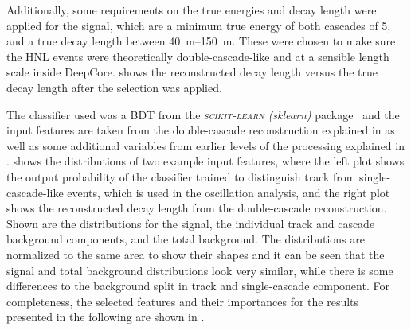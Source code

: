 Additionally, some requirements on the true energies and decay length were applied for the signal, which are a minimum true energy of both cascades of \SI{5}{\gev}, and a true decay length between \SIrange[range-phrase={~and~}]{40}{150}{\meter}. These were chosen to make sure the HNL events were theoretically double-cascade-like and at a sensible length scale inside DeepCore.  shows the reconstructed decay length versus the true decay length after the selection was applied.

The classifier used was a BDT from the \textit{\textsc{scikit-learn} (sklearn)} package~ and the input features are taken from the double-cascade reconstruction explained in  as well as some additional variables from earlier levels of the processing explained in .  shows the distributions of two example input features, where the left plot shows the output probability of the classifier trained to distinguish track from single-cascade-like events, which is used in the oscillation analysis, and the right plot shows the reconstructed decay length from the double-cascade reconstruction. Shown are the distributions for the signal, the individual track and cascade background components, and the total background. The distributions are normalized to the same area to show their shapes and it can be seen that the signal and total background distributions look very similar, while there is some differences to the background split in track and single-cascade component. For completeness, the selected features and their importances for the results presented in the following are shown in .

